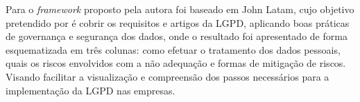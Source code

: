 \documentclass[
	12pt,				%
	openright,			%
	oneside,			%
	a4paper,			%
	english,			%
	french,				%
	spanish,			%
	brazil,				%
	]{abntex2}
\begin{document}
Para o \textit{framework} proposto pela autora foi baseado em John Latam, cujo objetivo pretendido por \cite{Zini2020} é cobrir os requisitos e artigos da LGPD, aplicando boas práticas de governança e segurança dos dados, onde o resultado foi apresentado de forma esquematizada em três colunas: como efetuar o tratamento dos dados pessoais, quais os riscos envolvidos com a não adequação e formas de mitigação de riscos. Visando facilitar a visualização e compreensão dos passos necessários para a implementação da LGPD nas empresas.

\end{document}
